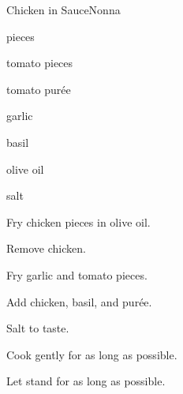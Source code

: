 \begin{recipe}{Chicken in Sauce}{Nonna}{}

\begin{ingredients}
\item {} pieces
\item tomato pieces
\item tomato pur\'ee
\item garlic
\item basil
\item olive oil
\item salt
\end{ingredients}

\begin{directions}
\item Fry chicken pieces in olive oil.
\item Remove chicken.
\item Fry garlic and tomato pieces.
\item Add chicken, basil, and pur\'ee.
\item Salt to taste.
\item Cook gently for as long as possible.
\item Let stand for as long as possible.
\end{directions}

\end{recipe}
